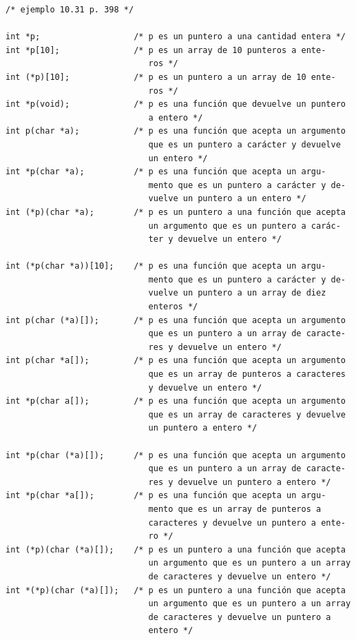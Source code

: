 \documentclass{article}
\begin{document}
\begin{verbatim}
/* ejemplo 10.31 p. 398 */

int *p;                   /* p es un puntero a una cantidad entera */
int *p[10];               /* p es un array de 10 punteros a ente-
                             ros */
int (*p)[10];             /* p es un puntero a un array de 10 ente-
                             ros */
int *p(void);             /* p es una función que devuelve un puntero
                             a entero */
int p(char *a);           /* p es una función que acepta un argumento
                             que es un puntero a carácter y devuelve
                             un entero */
int *p(char *a);          /* p es una función que acepta un argu-
                             mento que es un puntero a carácter y de-
                             vuelve un puntero a un entero */
int (*p)(char *a);        /* p es un puntero a una función que acepta
                             un argumento que es un puntero a carác-
                             ter y devuelve un entero */
                             
int (*p(char *a))[10];    /* p es una función que acepta un argu-
                             mento que es un puntero a carácter y de-
                             vuelve un puntero a un array de diez
                             enteros */
int p(char (*a)[]);       /* p es una función que acepta un argumento
                             que es un puntero a un array de caracte-
                             res y devuelve un entero */
int p(char *a[]);         /* p es una función que acepta un argumento
                             que es un array de punteros a caracteres
                             y devuelve un entero */
int *p(char a[]);         /* p es una función que acepta un argumento
                             que es un array de caracteres y devuelve 
                             un puntero a entero */
                             
int *p(char (*a)[]);      /* p es una función que acepta un argumento
                             que es un puntero a un array de caracte-
                             res y devuelve un puntero a entero */
int *p(char *a[]);        /* p es una función que acepta un argu-
                             mento que es un array de punteros a
                             caracteres y devuelve un puntero a ente-
                             ro */
int (*p)(char (*a)[]);    /* p es un puntero a una función que acepta
                             un argumento que es un puntero a un array
                             de caracteres y devuelve un entero */
int *(*p)(char (*a)[]);   /* p es un puntero a una función que acepta
                             un argumento que es un puntero a un array
                             de caracteres y devuelve un puntero a 
                             entero */


\end{verbatim}
\end{document}
